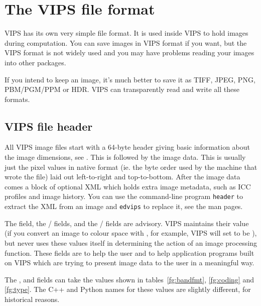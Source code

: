 \section{The VIPS file format}

VIPS has its own very simple file format. It is used inside VIPS to hold
images during computation. You can save images in VIPS format if you want,
but the VIPS format is not widely used and you may have problems reading
your images into other packages.

If you intend to keep an image, it's much better to save it as TIFF, 
JPEG, PNG, PBM/PGM/PPM or HDR. VIPS can transparently read and write all
these formats.

\subsection{VIPS file header}
\label{sec:header}

All VIPS image files start with a 64-byte header giving basic information
about the image dimensions, see . This is followed by the 
image data. This is usually just the pixel values in native format (ie. the
byte order used by the machine that wrote the file) laid out left-to-right and
top-to-bottom. After the image data comes a block of optional XML which holds
extra image metadata, such as ICC profiles and image history.
You can use the command-line program \verb+header+ to extract the XML from an
image and \verb+edvips+ to replace it, see the man pages.

The  field, the / fields, and the
/ fields are advisory. VIPS maintains their value
(if you convert an image to \cielab{} colour space with ,
for example, VIPS will set  to be ), but never
uses these values itself in determining the action of an image processing
function. These fields are to help the user and to help application
programs built on VIPS which are trying to present image data to the user
in a meaningful way.

The ,  and  fields can take the values
shown in tables~\ref{fg:bandfmt}, \ref{fg:coding} and \ref{fg:type}. The C++
and Python names for these values are slightly different, for historical
reasons.

